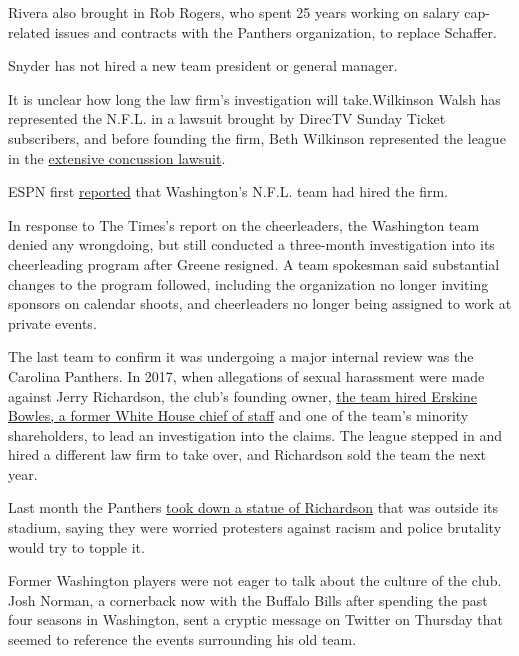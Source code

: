 Rivera also brought in Rob Rogers, who spent 25 years working on salary
cap-related issues and contracts with the Panthers organization, to
replace Schaffer.

Snyder has not hired a new team president or general manager.

It is unclear how long the law firm's investigation will take.Wilkinson
Walsh has represented the N.F.L. in a lawsuit brought by DirecTV Sunday
Ticket subscribers, and before founding the firm, Beth Wilkinson
represented the league in the
\href{https://www.nytimes3xbfgragh.onion/2013/08/30/sports/football/judge-announces-settlement-in-nfl-concussion-suit.html}{extensive
concussion lawsuit}.

ESPN first
\href{https://twitter.com/AdamSchefter/status/1283798174583398402}{reported}
that Washington's N.F.L. team had hired the firm.

In response to The Times's report on the cheerleaders, the Washington
team denied any wrongdoing, but still conducted a three-month
investigation into its cheerleading program after Greene resigned. A
team spokesman said substantial changes to the program followed,
including the organization no longer inviting sponsors on calendar
shoots, and cheerleaders no longer being assigned to work at private
events.

The last team to confirm it was undergoing a major internal review was
the Carolina Panthers. In 2017, when allegations of sexual harassment
were made against Jerry Richardson, the club's founding owner,
\href{https://www.nytimes3xbfgragh.onion/2017/12/18/sports/jerry-richardson-panthers.html}{the
team hired Erskine Bowles, a former White House chief of staff} and one
of the team's minority shareholders, to lead an investigation into the
claims. The league stepped in and hired a different law firm to take
over, and Richardson sold the team the next year.

Last month the Panthers
\href{https://www.charlotteobserver.com/sports/spt-columns-blogs/scott-fowler/article243428601.html}{took
down a statue of Richardson} that was outside its stadium, saying they
were worried protesters against racism and police brutality would try to
topple it.

Former Washington players were not eager to talk about the culture of
the club. Josh Norman, a cornerback now with the Buffalo Bills after
spending the past four seasons in Washington, sent a cryptic message on
Twitter on Thursday that seemed to reference the events surrounding his
old team.

